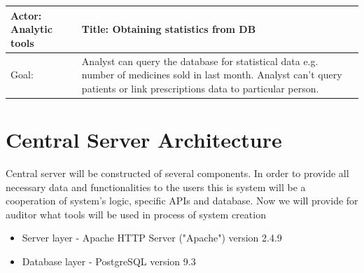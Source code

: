 \begin{table}[h]
    \begin{tabular}{| p{6cm} | p{7.75cm} |}
    \hline
    Actor: Analytic tools &Title: Obtaining statistics from DB \\ \hline
    Goal: & Analyst can query the database for statistical data e.g. number of medicines sold in last month. Analyst can't query patients or link prescriptions data to particular person. \\ \hline
    \end{tabular}
\end{table}

\section{Central Server Architecture}

Central server will be constructed of several components. In order to provide all necessary data and functionalities to the users this is system will be a cooperation of system's logic, specific APIs and database. Now we will provide for auditor what tools will be used in process of system creation
\begin{itemize}
\item Server layer - Apache HTTP Server ("Apache") version 2.4.9
\item Database layer - PostgreSQL version 9.3
\end{itemize}

